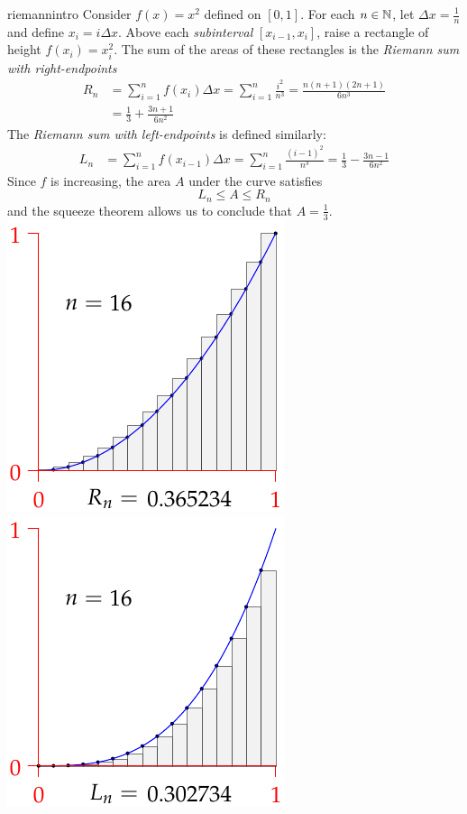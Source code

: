 \begin{example}[lower separated=false, sidebyside, sidebyside align=top seam, sidebyside gap=0pt, righthand width=0.39\linewidth]{}{riemannintro}
Consider $f(x)=x^2$ defined on $[0,1]$.\smallbreak
For each $n\in\mathbb{N}$, let $\Delta x=\frac 1n$ and define $x_i=i\Delta x$.\smallbreak
Above each \emph{subinterval} $[x_{i-1},x_i]$, raise a rectangle of height $f(x_i)=x_i^2$.\smallbreak
The sum of the areas of these rectangles is the \emph{Riemann sum with right-endpoints}\footnotemark
\begin{align*}
  R_n&=\sum_{i=1}^n f(x_i)\Delta x =\sum_{i=1}^n\frac{i^2}{n^3}
  =\frac{n(n+1)(2n+1)}{6n^3}\\ &=\frac 13+\frac{3n+1}{6n^2}
\end{align*}
The \emph{Riemann sum with left-endpoints} is defined similarly:
\begin{align*}
  L_n&=\sum_{i=1}^n f(x_{i-1})\Delta x =\sum_{i=1}^n\frac{(i-1)^2}{n^3} =\frac 13-\frac{3n-1}{6n^2}
\end{align*}
Since $f$ is increasing, the area $A$ under the curve satisfies
\[L_n\le A\le R_n\]
and the squeeze theorem allows us to conclude that $A=\frac 13$.
\tcblower
\vspace{-5pt}
\flushright\href{https://www.math.uci.edu/~ndonalds/math140b/riemann.html}{\includegraphics{area-up}\smallbreak
\includegraphics{area-down}}
\end{example}
\goodbreak

